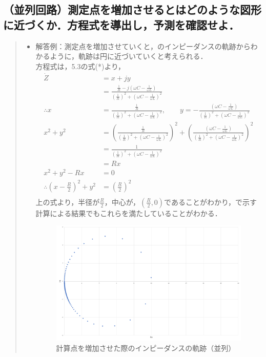 \documentclass[11pt,dvipdfmx]{jarticle}
\begin{document}
\subsection{（並列回路）測定点を増加させるとはどのような図形に近づくか．方程式を導出し，予測を確認せよ．}
\begin{quote}
\begin{itemize}
\item 解答例：測定点を増加させていくと，のインピーダンスの軌跡からわかるように，軌跡は円に近づいていくと考えられる．\\
方程式は，5.3の式(*)より，\\
\begin{align*}
\dot{Z}&=x+j y\\
&=\frac{\frac{1}{R}-j\left(\omega C-\frac{1}{\omega L}\right)}{\left(\frac{1}{R}\right)^{2}+\left(\omega C-\frac{1}{\omega L}\right)^{2}}\\
\therefore x&=\frac{\frac{1}{R}}{\left(\frac{1}{R}\right)^{2}+\left(\omega C-\frac{1}{\omega L}\right)^{2}},\qquad y=-\frac{\left(\omega C-\frac{1}{\omega L}\right)}{\left(\frac{1}{R}\right)^{2}+\left(\omega C-\frac{1}{\omega L}\right)^{2}}\\
x^2+y^2&=\left(\frac{\frac{1}{R}}{\left(\frac{1}{R}\right)^{2}+\left(\omega C-\frac{1}{\omega L}\right)^{2}}\right)^{2}+\left(\frac{\left(\omega C-\frac{1}{\omega L}\right)}{\left(\frac{1}{R}\right)^{2}+\left(\omega C-\frac{1}{\omega L}\right)^2}\right)^2\\
&=\frac{1}{\left(\frac{1}{R}\right)^2+\left(\omega C-\frac{1}{\omega L}\right)^{2}}\\
&=Rx\\
x^{2}+y^{2}-Rx&=0\\
\therefore \left(x-\frac{R}{2}\right)^2+y^2&=\left(\frac{R}{2}\right)^2\\
\end{align*}
上の式より，半径が$\frac{R}{2}$，中心が，$\left(\frac{R}{2},0\right)$であることがわかり，で示す計算による結果でもこれらを満たしていることがわかる．
\begin{figure}
 \centering
 \includegraphics[scale=0.45]{./fig/fig7.pdf}
 \caption{計算点を増加させた際のインピーダンスの軌跡（並列）}
 \label{fig:fig15}
\end{figure}


\end{itemize}
\end{quote}
\end{document}
